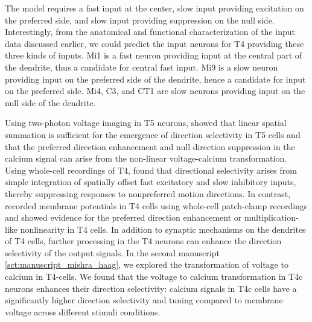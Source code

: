 The model requires a fast input at the center, slow input providing excitation on the preferred side, and slow input providing suppression on the null side. Interestingly, from the anatomical and functional characterization of the input data discussed earlier, we could predict the input neurons for T4 providing these three kinds of inputs. Mi1 is a fast neuron providing input at the central part of the dendrite, thus a candidate for central fast input. Mi9 is a slow neuron providing input on the preferred side of the dendrite, hence a candidate for input on the preferred side. Mi4, C3, and CT1 are slow neurons providing input on the null side of the dendrite. 

Using two-photon voltage imaging in T5 neurons, \cite{Wienecke2018} showed that linear spatial summation is sufficient for the emergence of direction selectivity in T5 cells and that the preferred direction enhancement and null direction suppression in the calcium signal can arise from the non-linear voltage-calcium transformation. Using whole-cell recordings of T4, \cite{Gruntman2018} found that directional selectivity arises from simple integration of spatially offset fast excitatory and slow inhibitory inputs, thereby suppressing responses to nonpreferred motion directions. In contrast, \cite{Groschner2022} recorded membrane potentials in T4 cells using whole-cell patch-clamp recordings and showed evidence for the preferred direction enhancement or multiplication-like nonlinearity in T4 cells. In addition to synaptic mechanisms on the dendrites of T4 cells, further processing in the T4 neurons can enhance the direction selectivity of the output signals. In the second manuscript \ref{sct:manuscript_mishra_haag}, we explored the transformation of voltage to calcium in T4-cells. We found that the voltage to calcium transformation in T4c neurons enhances their direction selectivity: calcium signals in T4c cells have a significantly higher direction selectivity and tuning compared to membrane voltage across different stimuli conditions. 

